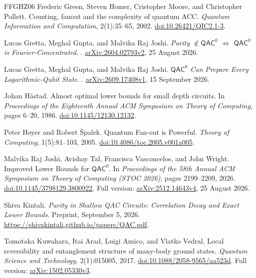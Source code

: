 \begin{thebibliography}{FFGHZ06}
Frederic Green, Steven Homer, Cristopher Moore, and Christopher Pollett.
\newblock Counting, fanout and the complexity of quantum ACC.
\newblock \emph{Quantum Information and Computation}, 2(1):35--65, 2002.
\newblock \href{https://doi.org/10.26421/QIC2.1-3}{doi:10.26421/QIC2.1-3}.

Lucas Gretta, Meghal Gupta, and Malvika Raj Joshi.
\newblock \emph{Parity $\notin\mathsf{QAC}^{0}$ $\Longleftrightarrow$
$\mathsf{QAC}^{0}$ is Fourier-Concentrated}.
. \href{https://arxiv.org/abs/2604.02793v2}{arXiv:2604.02793v2},
25 August 2026.

Lucas Gretta, Meghal Gupta, and Malvika Raj Joshi.
\newblock \emph{$\mathsf{QAC}^{0}$ Can Prepare Every Logarithmic-Qubit State}.
. \href{https://arxiv.org/abs/2609.17408v1}{arXiv:2609.17408v1},
15 September 2026.

Johan H\aa stad.
\newblock Almost optimal lower bounds for small depth circuits.
\newblock In \emph{Proceedings of the Eighteenth Annual ACM Symposium on
Theory of Computing}, pages 6--20, 1986.
\newblock \href{https://doi.org/10.1145/12130.12132}{doi:10.1145/12130.12132}.

Peter H\o yer and Robert \v Spalek.
\newblock Quantum Fan-out is Powerful.
\newblock \emph{Theory of Computing}, 1(5):81--103, 2005.
\newblock \href{https://doi.org/10.4086/toc.2005.v001a005}{doi:10.4086/toc.2005.v001a005}.

Malvika Raj Joshi, Avishay Tal, Francisca Vasconcelos, and John Wright.
\newblock Improved Lower Bounds for $\mathsf{QAC}^{0}$.
\newblock In \emph{Proceedings of the 58th Annual ACM Symposium on Theory of
Computing (STOC 2026)}, pages 2199--2209, 2026.
\newblock \href{https://doi.org/10.1145/3798129.3800922}{doi:10.1145/3798129.3800922}.
Full version: \href{https://arxiv.org/abs/2512.14643v4}{arXiv:2512.14643v4},
25 August 2026.

Shiva Kintali.
\newblock \emph{Parity in Shallow QAC Circuits: Correlation Decay and Exact
Lower Bounds}.
\newblock Preprint, September 5, 2026.
\newblock \url{https://shivakintali.github.io/papers/QAC.pdf}.

Tomotaka Kuwahara, Itai Arad, Luigi Amico, and Vlatko Vedral.
\newblock Local reversibility and entanglement structure of many-body ground states.
\newblock \emph{Quantum Science and Technology}, 2(1):015005, 2017.
\newblock \href{https://doi.org/10.1088/2058-9565/aa523d}{doi:10.1088/2058-9565/aa523d}.
Full version: \href{https://arxiv.org/abs/1502.05330v3}{arXiv:1502.05330v3}.


\end{thebibliography}
